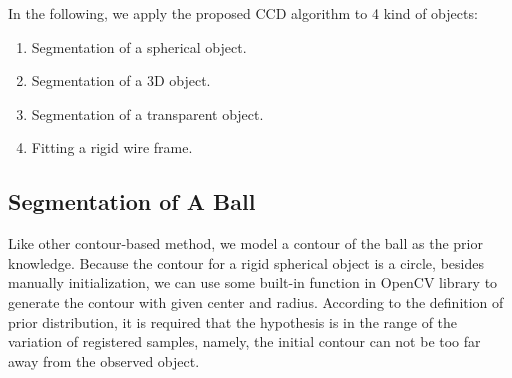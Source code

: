 In the following, we apply the proposed CCD algorithm to 4 kind of
objects:
\begin{enumerate}
\item Segmentation of a spherical object.
\item Segmentation of a 3D object.
\item Segmentation of a transparent object.
\item Fitting a rigid wire frame.
\end{enumerate}

\subsection{Segmentation of A Ball}
\label{sec:sb}
Like other contour-based method, we model a contour of the ball as the
prior knowledge. Because the contour for a rigid spherical object is a
circle, besides manually initialization, we can use some built-in function in
OpenCV library to generate the contour with given center and
radius. According to the definition of prior distribution, it is required
that the hypothesis is in the range of the variation of
registered samples, namely, the initial contour can not be too far away
from the observed object.

